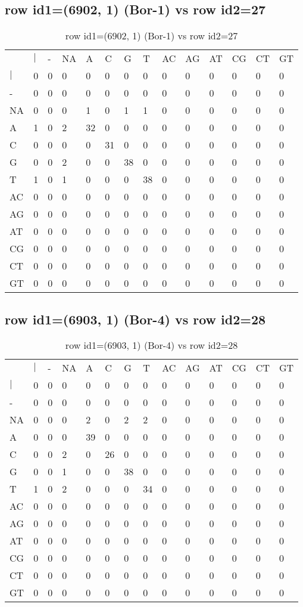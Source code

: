 \subsection{row id1=(6902, 1) (Bor-1) vs row id2=27}
\begin{center}
\begin{longtable}{|l|l|l|l|l|l|l|l|l|l|l|l|l|l|}
\caption{row id1=(6902, 1) (Bor-1) vs row id2=27} \label{table_dm66}\\
\hline
\\
\hline
&$|$&-&NA&A&C&G&T&AC&AG&AT&CG&CT&GT\\
$|$&0&0&0&0&0&0&0&0&0&0&0&0&0\\
-&0&0&0&0&0&0&0&0&0&0&0&0&0\\
NA&0&0&0&1&0&1&1&0&0&0&0&0&0\\
A&1&0&2&32&0&0&0&0&0&0&0&0&0\\
C&0&0&0&0&31&0&0&0&0&0&0&0&0\\
G&0&0&2&0&0&38&0&0&0&0&0&0&0\\
T&1&0&1&0&0&0&38&0&0&0&0&0&0\\
AC&0&0&0&0&0&0&0&0&0&0&0&0&0\\
AG&0&0&0&0&0&0&0&0&0&0&0&0&0\\
AT&0&0&0&0&0&0&0&0&0&0&0&0&0\\
CG&0&0&0&0&0&0&0&0&0&0&0&0&0\\
CT&0&0&0&0&0&0&0&0&0&0&0&0&0\\
GT&0&0&0&0&0&0&0&0&0&0&0&0&0\\
\hline
\end{longtable}
\end{center}

\subsection{row id1=(6903, 1) (Bor-4) vs row id2=28}
\begin{center}
\begin{longtable}{|l|l|l|l|l|l|l|l|l|l|l|l|l|l|}
\caption{row id1=(6903, 1) (Bor-4) vs row id2=28} \label{table_dm68}\\
\hline
\\
\hline
&$|$&-&NA&A&C&G&T&AC&AG&AT&CG&CT&GT\\
$|$&0&0&0&0&0&0&0&0&0&0&0&0&0\\
-&0&0&0&0&0&0&0&0&0&0&0&0&0\\
NA&0&0&0&2&0&2&2&0&0&0&0&0&0\\
A&0&0&0&39&0&0&0&0&0&0&0&0&0\\
C&0&0&2&0&26&0&0&0&0&0&0&0&0\\
G&0&0&1&0&0&38&0&0&0&0&0&0&0\\
T&1&0&2&0&0&0&34&0&0&0&0&0&0\\
AC&0&0&0&0&0&0&0&0&0&0&0&0&0\\
AG&0&0&0&0&0&0&0&0&0&0&0&0&0\\
AT&0&0&0&0&0&0&0&0&0&0&0&0&0\\
CG&0&0&0&0&0&0&0&0&0&0&0&0&0\\
CT&0&0&0&0&0&0&0&0&0&0&0&0&0\\
GT&0&0&0&0&0&0&0&0&0&0&0&0&0\\
\hline
\end{longtable}
\end{center}

